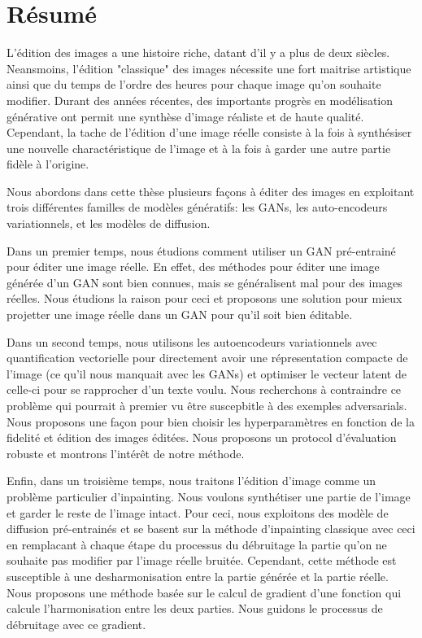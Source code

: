 \chapter{R\'esum\'e}


L'édition des images a une histoire riche, datant d'il y a plus de deux siècles. 
Neansmoins, l'édition "classique" des images nécessite une fort maitrise artistique
ainsi que du temps de l'ordre des heures pour chaque image qu'on souhaite modifier.
Durant des années récentes, des importants progrès en modélisation générative ont 
permit une synthèse d'image réaliste et de haute qualité. Cependant, la tache de l'édition 
d'une image réelle consiste à la fois à synthésiser une nouvelle charactéristique de 
l'image et à la fois à garder une autre partie fidèle à l'origine. 

Nous abordons dans cette thèse plusieurs façons à éditer des images en exploitant 
trois différentes familles de modèles génératifs: les GANs, les auto-encodeurs 
variationnels,  et 
les modèles de diffusion. 

Dans un premier temps, nous étudions comment utiliser un GAN pré-entrainé pour éditer 
une image réelle. En effet, des méthodes pour éditer une image générée d'un GAN sont 
bien connues, mais se généralisent mal pour des images réelles. Nous étudions la raison 
pour ceci et proposons une solution pour mieux projetter une image réelle dans un GAN 
pour qu'il soit bien éditable.

Dans un second temps, nous utilisons les autoencodeurs variationnels avec quantification 
vectorielle pour directement avoir une répresentation compacte de l'image (ce qu'il nous 
manquait avec les GANs) et optimiser le vecteur latent de celle-ci pour se rapprocher 
d'un texte voulu. Nous recherchons à contraindre ce problème qui pourrait à premier vu 
être suscepbitle à des exemples adversarials. Nous proposons une façon pour bien choisir 
les hyperparamètres en fonction de la fidelité et édition des images éditées. Nous proposons
un protocol d'évaluation robuste et montrons l'intérêt de notre méthode.

Enfin, dans un troisième temps, nous traitons l'édition d'image comme un problème 
particulier d'inpainting. Nous voulons synthétiser une partie de l'image et garder le 
reste de l'image intact. Pour ceci, nous exploitons des modèle de diffusion pré-entrainés 
et se basent sur la méthode d'inpainting classique avec ceci en remplacant à chaque étape 
du processus du débruitage la partie qu'on ne souhaite pas modifier par l'image réelle bruitée.
Cependant, cette méthode est susceptible à une desharmonisation entre la partie 
générée et la partie réelle. Nous proposons une méthode basée sur le calcul de gradient 
d'une fonction qui calcule l'harmonisation entre les deux parties. Nous guidons le 
processus de débruitage avec ce gradient.







